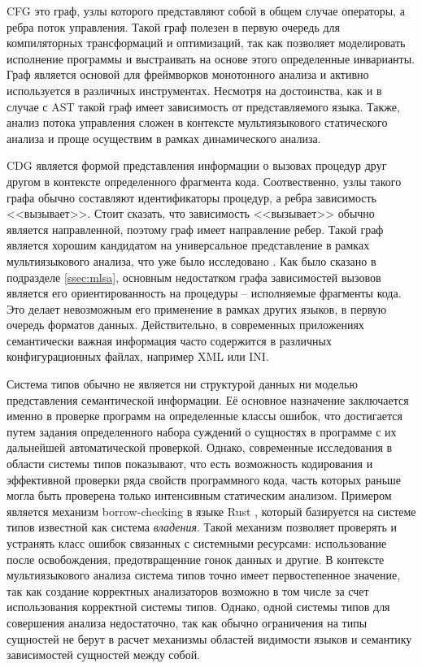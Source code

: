 CFG  это граф, узлы которого представляют собой в общем случае операторы, а ребра
поток управления. Такой граф полезен в первую очередь для компиляторных трансформаций и оптимизаций,
так как позволяет моделировать исполнение программы и выстраивать на основе этого определенные инварианты.
Граф является основой для фреймворков монотонного анализа \cite{static-program-analysis} и активно
используется в различных инструментах. Несмотря на достоинства, как и в случае с AST такой граф
имеет зависимость от представляемого языка. Также, анализ потока управления сложен в контексте
мультиязыкового статического анализа и проще осуществим в рамках динамического анализа.

CDG является формой представления информации о вызовах процедур друг другом в контексте
определенного фрагмента кода. Соотвественно, узлы такого графа обычно составляют идентификаторы
процедур, а ребра зависимость <<вызывает>>. Стоит сказать, что зависимость <<вызывает>> обычно является
направленной, поэтому граф имеет направление ребер. Такой граф является хорошим кандидатом на универсальное
представление в рамках мультиязыкового анализа, что уже было исследовано \cite{MLSA}. Как было
сказано в подразделе \ref{ssec:mlsa}, основным недостатком графа зависимостей вызовов является
его ориентированность на процедуры -- исполняемые фрагменты кода. Это делает невозможным его применение
в рамках других языков, в первую очередь форматов данных. Действительно, в современных приложениях
семантически важная информация часто содержится в различных конфигурационных файлах, например XML или
INI.

Система типов обычно не является ни структурой данных ни моделью представления семантической информации.
Её основное назначение заключается именно в проверке программ на определенные классы ошибок,
что достигается путем задания определенного набора суждений о сущностях в программе с
их дальнейшей автоматической проверкой.
Однако, современные исследования в области системы типов показывают, что
есть возможность кодирования и эффективной проверки ряда свойств программного кода, часть
которых раньше могла быть проверена только интенсивным статическим анализом. Примером является
механизм borrow-checking в языке Rust \cite{rust}, который базируется на системе типов известной
как система \textit{владения}. Такой механизм позволяет проверять и устранять класс ошибок связанных
с системными ресурсами: использование после освобождения, предотвращенние гонок данных и другие.
В контексте мультиязыкового анализа система типов точно имеет первостепенное значение, так
как создание корректных анализаторов возможно в том числе за счет использования корректной
системы типов. Однако, одной системы типов для совершения анализа недостаточно, так как
обычно ограничения на типы сущностей не берут в расчет механизмы областей видимости языков
и семантику зависимостей сущностей между собой.

